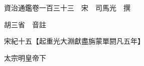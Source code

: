 










 


 
 


 

  
  
  
  
  





  
  
  
  
  
 
  

  

  
  
  



  

 
 

  
   




  

  
  


  　　資治通鑑卷一百三十三　宋　司馬光　撰

　　胡三省　音註

　　宋紀十五【起重光大淵獻盡旃蒙單閼凡五年】

　　太宗明皇帝下

